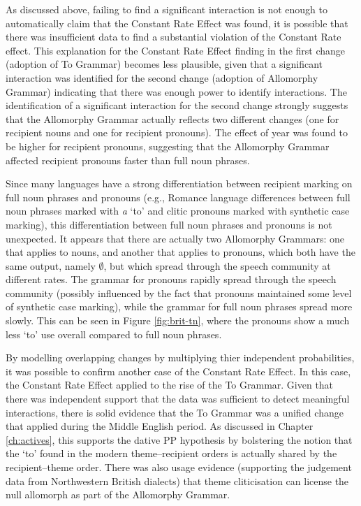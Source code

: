 	As discussed above, failing to find a significant interaction is not enough to automatically claim that the Constant Rate Effect was found, it is possible that there was insufficient data to find a substantial violation of the Constant Rate effect. This explanation for the Constant Rate Effect finding in the first change (adoption of To Grammar) becomes less plausible, given that a significant interaction was identified for the second change (adoption of Allomorphy Grammar) indicating that there was enough power to identify interactions. The identification of a significant interaction for the second change strongly suggests that the Allomorphy Grammar actually reflects two different changes (one for recipient nouns and one for recipient pronouns). The effect of year was found to be higher for recipient pronouns, suggesting that the Allomorphy Grammar affected recipient pronouns faster than full noun phrases.
	
	Since many languages have a strong differentiation between recipient marking on full noun phrases and pronouns (e.g., Romance language differences between full noun phrases marked with \textit{a} `to' and clitic pronouns marked with synthetic case marking), this differentiation between full noun phrases and pronouns is not unexpected. It appears that there are actually two Allomorphy Grammars: one that applies to nouns, and another that applies to pronouns, which both have the same output, namely $\emptyset$, but which spread through the speech community at different rates. The grammar for pronouns rapidly spread through the speech community (possibly influenced by the fact that pronouns maintained some level of synthetic case marking), while the grammar for full noun phrases spread more slowly. This can be seen in Figure \ref{fig:brit-tn}, where the pronouns show a much less `to' use overall compared to full noun phrases.

	By modelling overlapping changes by multiplying thier independent probabilities, it was possible to confirm another case of the Constant Rate Effect. In this case, the Constant Rate Effect applied to the rise of the To Grammar. Given that there was independent support that the data was sufficient to detect meaningful interactions, there is solid evidence that the To Grammar was a unified change that applied during the Middle English period. As discussed in Chapter \ref{ch:actives}, this supports the dative PP hypothesis by bolstering the notion that the `to' found in the modern theme--recipient orders is actually shared by the recipient--theme order. There was also usage evidence (supporting the judgement data from Northwestern British dialects) that theme cliticisation can license the null allomorph as part of the Allomorphy Grammar.
	
